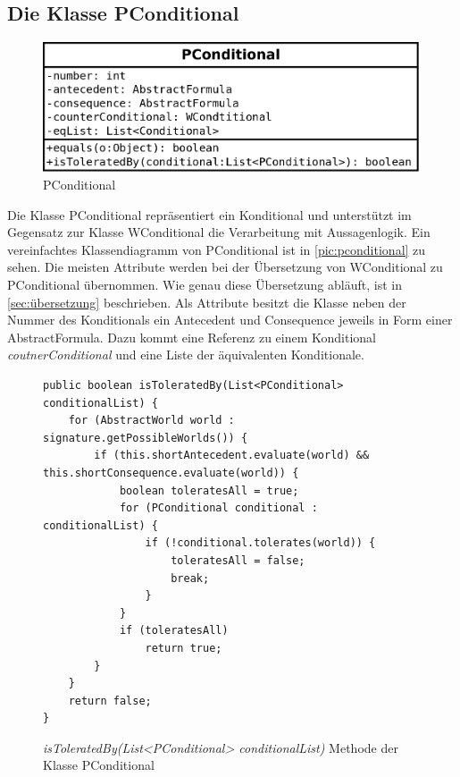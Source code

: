 \documentclass[12pt,a4paper]{article}
\begin{document}
\subsection{Die Klasse PConditional}
\label{sec:pconditional}
\begin{figure}
\includegraphics[width=0.55\linewidth]{bilder/PConditional.png}
\caption{PConditional}
\label{pic:pconditional}
\end{figure}


Die Klasse PConditional repräsentiert ein Konditional und unterstützt im Gegensatz zur Klasse WConditional die Verarbeitung mit Aussagenlogik. Ein vereinfachtes Klassendiagramm von PConditional ist in \autoref{pic:pconditional} zu sehen. Die meisten Attribute werden bei der Übersetzung von WConditional zu PConditional übernommen. Wie genau diese Übersetzung abläuft, ist in \autoref{sec:übersetzung} beschrieben. Als Attribute besitzt die Klasse neben der Nummer des Konditionals ein Antecedent und Consequence jeweils in Form einer AbstractFormula. Dazu kommt eine Referenz zu einem Konditional \textit{coutnerConditional} und eine Liste der äquivalenten Konditionale.


\begin{figure}
\begin{lstlisting}
public boolean isToleratedBy(List<PConditional> conditionalList) {
    for (AbstractWorld world : signature.getPossibleWorlds()) {
        if (this.shortAntecedent.evaluate(world) && this.shortConsequence.evaluate(world)) {
            boolean toleratesAll = true;
            for (PConditional conditional : conditionalList) {
                if (!conditional.tolerates(world)) {
                    toleratesAll = false;
                    break;
                }
            }
            if (toleratesAll)
                return true;
        }
    }
    return false;
}
\end{lstlisting}
\caption{\textit{isToleratedBy(List<PConditional> conditionalList)} Methode der Klasse PConditional}
\label{code:conditional-istoleratedby}
\end{figure}
\end{document}
